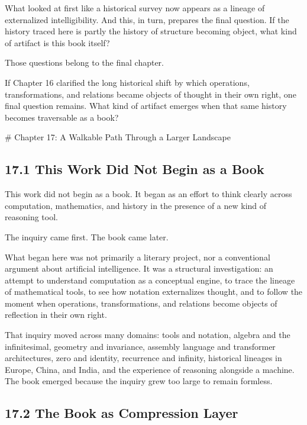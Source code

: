 \documentclass[
]{article}
\begin{document}
What looked at first like a historical survey now appears as a lineage
of externalized intelligibility. And this, in turn, prepares the final
question. If the history traced here is partly the history of structure
becoming object, what kind of artifact is this book itself?

Those questions belong to the final chapter.

If Chapter 16 clarified the long historical shift by which operations,
transformations, and relations became objects of thought in their own
right, one final question remains. What kind of artifact emerges when
that same history becomes traversable as a book?

\newpage
\vspace*{3cm}
\begin{center}
# Chapter 17: A Walkable Path Through a Larger Landscape
\end{center}

\hypertarget{this-work-did-not-begin-as-a-book}{%
\subsection{17.1 This Work Did Not Begin as a
Book}\label{this-work-did-not-begin-as-a-book}}

This work did not begin as a book. It began as an effort to think
clearly across computation, mathematics, and history in the presence of
a new kind of reasoning tool.

The inquiry came first. The book came later.

What began here was not primarily a literary project, nor a conventional
argument about artificial intelligence. It was a structural
investigation: an attempt to understand computation as a conceptual
engine, to trace the lineage of mathematical tools, to see how notation
externalizes thought, and to follow the moment when operations,
transformations, and relations become objects of reflection in their own
right.

That inquiry moved across many domains: tools and notation, algebra and
the infinitesimal, geometry and invariance, assembly language and
transformer architectures, zero and identity, recurrence and infinity,
historical lineages in Europe, China, and India, and the experience of
reasoning alongside a machine. The book emerged because the inquiry grew
too large to remain formless.

\hypertarget{the-book-as-compression-layer}{%
\subsection{17.2 The Book as Compression
Layer}\label{the-book-as-compression-layer}}
\end{document}
